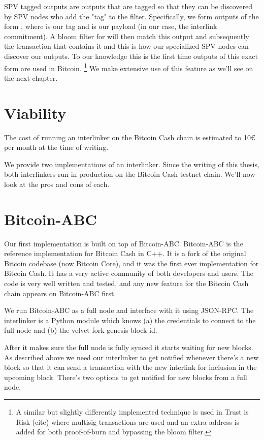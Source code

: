 SPV tagged outputs are outputs that are tagged so that they can be discovered by SPV nodes who add the "tag" to the filter. Specifically, we form outputs of the form , where  is our tag and  is our payload (in our case, the interlink commitment). A bloom filter for  will then match this output and subsequently the transaction that contains it and this is how our specialized SPV nodes can discover our outputs. To our knowledge this is the first time outputs of this exact form are used in Bitcoin.
\footnote{A similar but slightly differently implemented technique is used in Trust is Risk (cite) where multisig transactions are used and an extra address is added for both proof-of-burn and bypassing the bloom filter.}
We make extensive use of this feature as we'll see on the next chapter.

\section{Viability}
The cost of running an interlinker on the Bitcoin Cash chain is estimated to 10€ per month at the time of writing.

We provide two implementations of an interlinker. Since the writing of this thesis, both interlinkers run in production on the Bitcoin Cash testnet chain. We'll now look at the pros and cons of each.

\section{Bitcoin-ABC}
Our first implementation is built on top of Bitcoin-ABC. Bitcoin-ABC is the reference implementation for Bitcoin Cash in C++. It is a fork of the original Bitcoin codebase (now Bitcoin Core), and it was the first ever implementation for Bitcoin Cash. It has a very active community of both developers and users. The code is very well written and tested, and any new feature for the Bitcoin Cash chain appears on Bitcoin-ABC first.

We run Bitcoin-ABC as a full node and interface with it using JSON-RPC. The interlinker is a Python module which knows (a) the credentials to connect to the full node and (b) the velvet fork genesis block id.

After it makes sure the full node is fully synced it starts waiting for new blocks. As described above we need our interlinker to get notified whenever there's a new block so that it can send a transaction with the new interlink for inclusion in the upcoming block. There's two options to get notified for new blocks from a full node.

